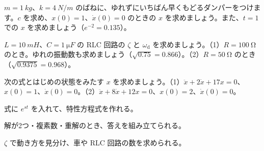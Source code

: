 \bkproblem $m=\qty{1}{kg}$、$k=\qty{4}{N/m}$ のばねに、ゆれずにいちばん早くもどるダンパーをつけます。$c$ を求め、$x(0)=1$、$\dot x(0)=0$ のときの $x$ を求めましょう。また、$t=1$ での $x$ を求めましょう（$e^{-2}=0.135$）。

\bkproblem $L=\qty{10}{mH}$、$C=\qty{1}{\micro F}$ の RLC 回路の $\zeta$ と $\omega_{\mathrm d}$ を求めましょう。\newline（1）$R=\qty{100}{\ohm}$ のとき。ゆれの振動数も求めましょう（$\sqrt{0.75}=0.866$）。\newline（2）$R=\qty{50}{\ohm}$ のとき（$\sqrt{0.9375}=0.968$）。

\bkproblem 次の式とはじめの状態をみたす $x$ を求めましょう。\newline（1）$\ddot x+2\dot x+17x=0$、$x(0)=1$、$\dot x(0)=0$。\newline（2）$\ddot x+8\dot x+12x=0$、$x(0)=2$、$\dot x(0)=0$。

\begin{furikaeri}
\begin{checklist}
\item 式に $e^{st}$ を入れて、特性方程式を作れる。
\item 解が2つ・複素数・重解のとき、答えを組み立てられる。
\item $\zeta$ で動き方を見分け、車や RLC 回路の数を求められる。
\end{checklist}
\end{furikaeri}

